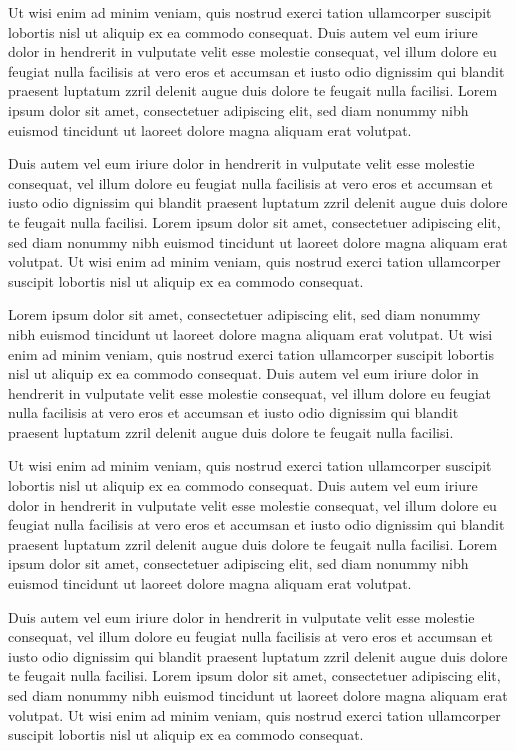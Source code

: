 \documentclass[oldfontcommands,6x9]{pupbook}
\begin{document}
Ut wisi enim ad minim veniam, quis nostrud exerci tation ullamcorper
suscipit lobortis nisl ut aliquip ex ea commodo consequat. Duis autem
vel eum iriure dolor in hendrerit in vulputate velit esse molestie
consequat, vel illum dolore eu feugiat nulla facilisis at vero eros et
accumsan et iusto odio dignissim qui blandit praesent luptatum zzril
delenit augue duis dolore te feugait nulla facilisi. Lorem ipsum dolor
sit amet, consectetuer adipiscing elit, sed diam nonummy nibh euismod
tincidunt ut laoreet dolore magna aliquam erat volutpat. 

Duis autem vel eum iriure dolor in hendrerit in vulputate velit esse
molestie consequat, vel illum dolore eu feugiat nulla facilisis at vero
eros et accumsan et iusto odio dignissim qui blandit praesent luptatum
zzril delenit augue duis dolore te feugait nulla facilisi. Lorem ipsum
dolor sit amet, consectetuer adipiscing elit, sed diam nonummy nibh
euismod tincidunt ut laoreet dolore magna aliquam erat volutpat. Ut wisi
enim ad minim veniam, quis nostrud exerci tation ullamcorper suscipit
lobortis nisl ut aliquip ex ea commodo consequat. 

Lorem ipsum dolor sit amet, consectetuer adipiscing elit, sed diam
nonummy nibh euismod tincidunt ut laoreet dolore magna aliquam erat
volutpat. Ut wisi enim ad minim veniam, quis nostrud exerci tation
ullamcorper suscipit lobortis nisl ut aliquip ex ea commodo consequat.
Duis autem vel eum iriure dolor in hendrerit in vulputate velit esse
molestie consequat, vel illum dolore eu feugiat nulla facilisis at vero
eros et accumsan et iusto odio dignissim qui blandit praesent luptatum
zzril delenit augue duis dolore te feugait nulla facilisi. 

Ut wisi enim ad minim veniam, quis nostrud exerci tation ullamcorper
suscipit lobortis nisl ut aliquip ex ea commodo consequat. Duis autem
vel eum iriure dolor in hendrerit in vulputate velit esse molestie
consequat, vel illum dolore eu feugiat nulla facilisis at vero eros et
accumsan et iusto odio dignissim qui blandit praesent luptatum zzril
delenit augue duis dolore te feugait nulla facilisi. Lorem ipsum dolor
sit amet, consectetuer adipiscing elit, sed diam nonummy nibh euismod
tincidunt ut laoreet dolore magna aliquam erat volutpat. 

Duis autem vel eum iriure dolor in hendrerit in vulputate velit esse
molestie consequat, vel illum dolore eu feugiat nulla facilisis at vero
eros et accumsan et iusto odio dignissim qui blandit praesent luptatum
zzril delenit augue duis dolore te feugait nulla facilisi. Lorem ipsum
dolor sit amet, consectetuer adipiscing elit, sed diam nonummy nibh
euismod tincidunt ut laoreet dolore magna aliquam erat volutpat. Ut wisi
enim ad minim veniam, quis nostrud exerci tation ullamcorper suscipit
lobortis nisl ut aliquip ex ea commodo consequat. 
\end{document}

